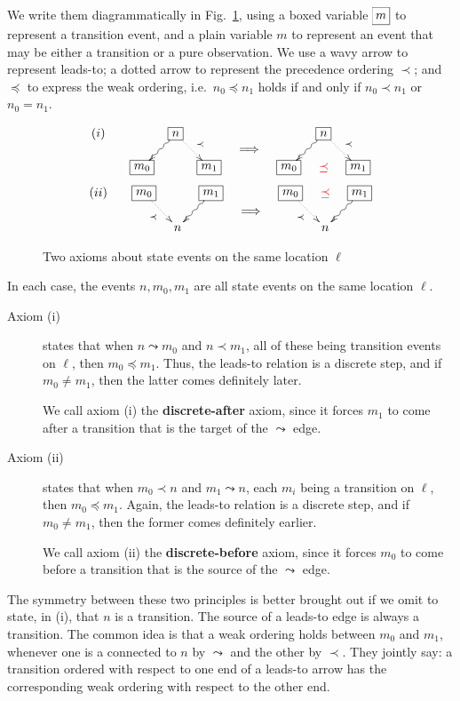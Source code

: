We write them diagrammatically in Fig.~\ref{fig:leads:to}, using a
boxed variable $\xymatrix@1{*+[F]{\,m\,\strut}}$ to represent a
transition event, and a plain variable $m$ to represent an event that
may be either a transition or a pure observation.  We use a wavy arrow
to represent leads-to; a dotted arrow to represent the precedence
ordering $\prec$; and $\preceq$ to express the weak ordering,
i.e.~$n_0\preceq n_1$ holds if and only if $n_0\prec n_1$ or
$n_0=n_1$.
%
\begin{figure}
  \centering
  \[(i)\qquad
    \xymatrix@R=1mm@C=4mm{&
      *+[F]{n}\ar@{~>}[ddl]\ar@{.>}[ddr]^{\prec} & & & &
      *+[F]{n}\ar@{~>}[ddl]\ar@{.>}[ddr]^{\prec} \\
      & & & \Longrightarrow &    \\
      *+[F]{m_0} & & *+[F]{m_1} & &
      *+[F]{m_0} & \textcolor{red}{\preceq} & *+[F]{m_1} }
  \]\vspace{3ex}
  \[(ii)\qquad
    \xymatrix@R=1mm@C=4mm{*+[F]{m_0}\ar@{.>}[ddr]_{\prec} & &
      *+[F]{m_1}\ar@{~>}[ddl] & &
      *+[F]{m_0}\ar@{.>}[ddr]_{\prec} &\textcolor{red}{\preceq} &
      *+[F]{m_1}\ar@{~>}[ddl]\\
      & & & \Longrightarrow   \\
      & n && && n}
  \] 
  \caption[Leads-to axioms]{Two axioms about state events on the same
    location $\ell$}
  \label{fig:leads:to}
\end{figure}
%

In each case, the events $n,m_0,m_1$ are all state events on the same
location $\ell$.
%
\begin{description}
  \item[Axiom (i)] states that when $n\leadsto m_0$ and $n\prec m_1$,
  all of these being transition events on $\ell$, then
  $m_0\preceq m_1$.  Thus, the leads-to relation is a discrete step,
  and if $m_0\not= m_1$, then the latter comes definitely later.

  We call axiom (i) the \textbf{discrete-after} axiom, since it forces
  $m_1$ to come after a transition that is the target of the
  $\leadsto$ edge.
  \item[Axiom (ii)] states that when $m_0\prec n$ and $m_1\leadsto n$,
  each $m_i$ being a transition on $\ell$, then $m_0\preceq m_1$.
  Again, the leads-to relation is a discrete step, and if
  $m_0\not= m_1$, then the former comes definitely earlier.

  We call axiom (ii) the \textbf{discrete-before} axiom, since it
  forces $m_0$ to come before a transition that is the source of the
  $\leadsto$ edge.
\end{description}
%
The symmetry between these two principles is better brought out if we
omit to state, in (i), that $n$ is a transition.  The source of a
leads-to edge is always a transition.  The common idea is that a weak
ordering holds between $m_0$ and $m_1$, whenever one is a connected to
$n$ by $\leadsto$ and the other by $\prec$.  They jointly say:  a
transition ordered with respect to one end of a leads-to arrow has the
corresponding weak ordering with respect to the other end.

